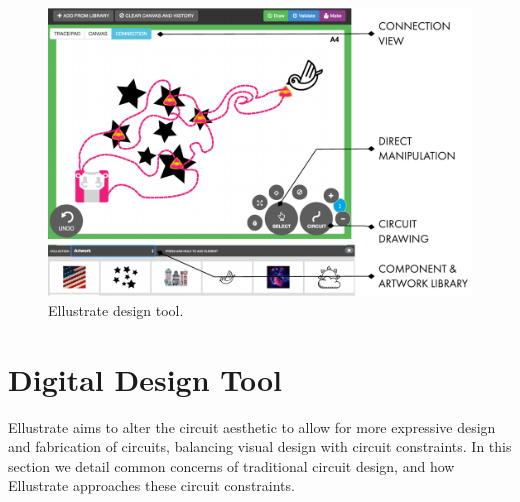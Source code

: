 \documentclass{sigchi}
\begin{document}



\begin{figure}[t]
\centering
\includegraphics[width=1.0\columnwidth]{figures/designtool.pdf}
\caption{Ellustrate design tool. }
\label{fig:design_tool}
\end{figure}
\section{Digital Design Tool}
    Ellustrate aims to alter the circuit aesthetic to allow for more expressive design and fabrication of circuits, balancing visual design with circuit constraints. In this section we detail common concerns of traditional circuit design, and how Ellustrate approaches these circuit constraints.
\end{document}
